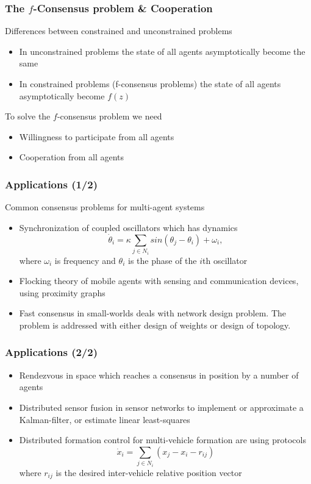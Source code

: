\documentclass{beamer}
\begin{document}

\begin{frame}
\frametitle{The $f$-Consensus problem \& Cooperation}
Differences between constrained and unconstrained problems
\begin{itemize}
\item In unconstrained problems the state of all agents asymptotically become the same  
\item In constrained problems (f-consensus problems) the state of all agents asymptotically become $f(z)$ 
\end{itemize}
\vspace{0.2cm}
To solve the $f$-consensus problem we need 
\begin{itemize}
\item Willingness to participate from all agents
\item Cooperation from all agents
\end{itemize}
\end{frame}


\begin{frame}
\frametitle{Applications (1/2)}
Common consensus problems for multi-agent systems
\begin{itemize}
\item Synchronization of coupled oscillators which has dynamics
\begin{equation*}
\dot{\theta}_i = \kappa \sum_{j \in N_i}sin(\theta_j-\theta_i) + \omega_i,
\end{equation*}
where $\omega_i$ is frequency and $\theta_i$ is the phase of the $i$th oscillator
\item Flocking theory of mobile agents with sensing and communication devices, using proximity graphs
\item Fast consensus in small-worlds deals with network design problem. The problem is addressed with either design of weights or design of topology.
\end{itemize}
\end{frame}


\begin{frame}
\frametitle{Applications (2/2)}
\begin{itemize}
\item Rendezvous in space which reaches a consensus in position by a number of agents
\item Distributed sensor fusion in sensor networks to implement or approximate a Kalman-filter, or estimate linear least-squares
\item Distributed formation control for multi-vehicle formation are using protocols
\begin{equation*}
\dot{x}_i=\sum_{j \in N_i}(x_j-x_i-r_{ij})
\end{equation*}
where $r_{ij}$ is the desired inter-vehicle relative position vector
\end{itemize}
\end{frame}
\end{document}
